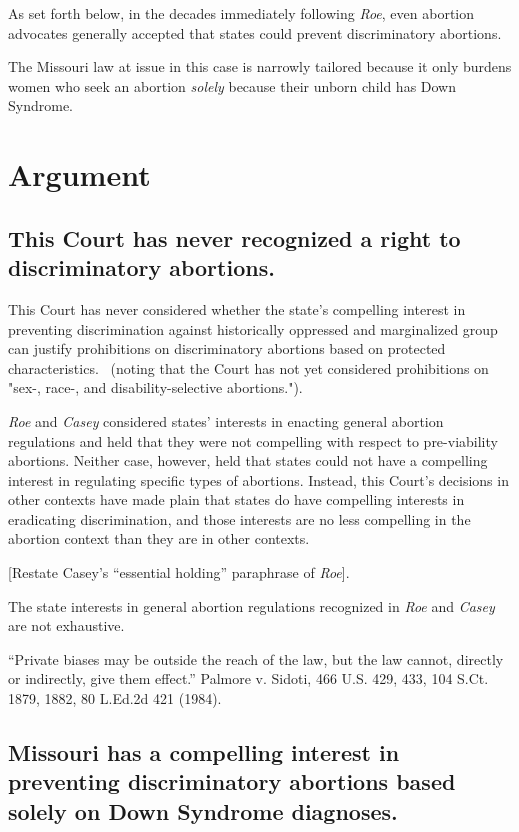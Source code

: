 \documentclass[12pt,\documentclassflag]{SCOTUS_Brief}
\begin{document}
As set forth below, in the decades immediately following \textit{Roe}, even abortion advocates generally accepted that states could prevent discriminatory abortions. 

The Missouri law at issue in this case is narrowly tailored because it only burdens women who seek an abortion \textit{solely} because their unborn child has Down Syndrome.

\section{Argument}

\subsection{This Court has never recognized a right to discriminatory abortions.}

This Court has never considered whether the state's compelling interest in preventing discrimination against historically oppressed and marginalized group can justify prohibitions on discriminatory abortions based on protected characteristics. ~(noting that the Court has not yet considered prohibitions on "sex-, race-, and disability-selective abortions.").

\textit{Roe} \cite[!]{Roe} and \textit{Casey} \cite[!]{Casey} considered states’ interests in enacting general abortion regulations and held that they were not compelling with respect to pre-viability abortions. Neither case, however, held that states could not have a compelling interest in regulating specific types of abortions. Instead, this Court’s decisions in other contexts have made plain that states do have compelling interests in eradicating discrimination, and those interests are no less compelling in the abortion context than they are in other contexts.

[Restate Casey’s “essential holding” paraphrase of \textit{Roe}].

The state interests in general abortion regulations recognized in \textit{Roe} and \textit{Casey} are not exhaustive.

“Private biases may be outside the reach of the law, but the law cannot, directly or indirectly, give them effect.” Palmore v. Sidoti, 466 U.S. 429, 433, 104 S.Ct. 1879, 1882, 80 L.Ed.2d 421 (1984).

\subsection{Missouri has a compelling interest in preventing discriminatory abortions based solely on Down Syndrome diagnoses.}
\end{document}
